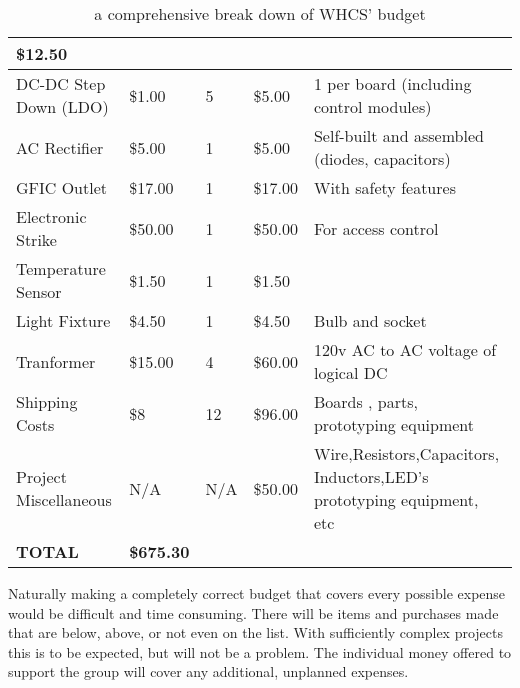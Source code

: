 \begin{table}[H]
{\begin{tabular}{|l|l|l|l|b{5cm}|}
{\color{black} \$12.50} &
\\\hline
{\color{black} DC{}-DC Step Down (LDO)} &
{\color{black} \$1.00} &
{\color{black} 5} &
{\color{black} \$5.00} &
{\color{black} 1 per board (including control modules)}\\\hline
{\color{black} AC Rectifier} &
{\color{black} \$5.00} &
{\color{black} 1} &
{\color{black} \$5.00} &
{\color{black} Self{}-built and assembled (diodes, capacitors)}\\\hline
{\color{black} GFIC Outlet} &
{\color{black} \$17.00} &
{\color{black} 1} &
{\color{black} \$17.00} &
{\color{black} With safety features}\\\hline
{\color{black} Electronic Strike} &
{\color{black} \$50.00} &
{\color{black} 1} &
{\color{black} \$50.00} &
{\color{black} For access control}\\\hline
{\color{black} Temperature Sensor} &
{\color{black} \$1.50} &
{\color{black} 1} &
{\color{black} \$1.50} &
\\\hline
{\color{black} Light Fixture} &
{\color{black} \$4.50} &
{\color{black} 1} &
{\color{black} \$4.50} &
{\color{black} Bulb and socket}\\\hline
{\color{black} Tranformer} &
{\color{black} \$15.00} &
{\color{black} 4} &
{\color{black} \$60.00} &
{\color{black} 120v AC to AC voltage of logical DC}\\\hline
{\color{black} Shipping Costs} &
{\color{black} \$8} &
{\color{black} 12} &
{\color{black} \$96.00} &
{\color{black} Boards , parts, prototyping equipment}\\\hline
{\color{black} Project Miscellaneous} &
{\color{black} N/A} &
{\color{black} N/A} &
{\color{black} \$50.00} &
{\color{black} Wire,Resistors,Capacitors, Inductors,LED{}'s prototyping equipment, etc}\\\hline
{\color{black} \textbf{TOTAL}} &
{\color{black} \textbf{\$675.30}} &
 &
 &
\\\hline
\end{tabular}
}
\caption{a comprehensive break down of WHCS' budget}
\label{tab:budget}
\end{table}

Naturally making a completely correct budget that covers every possible expense
would be difficult and time consuming. There will be items and purchases made
that are below, above, or not even on the list. With sufficiently complex
projects this is to be expected, but will not be a problem. The individual
money offered to support the group will cover any additional, unplanned
expenses.

